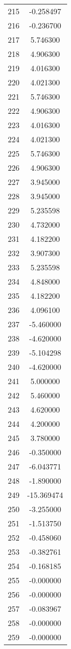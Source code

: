 \documentclass[12pt]{article}
\begin{document}
\begin{longtable}{@{}cc@{}}
215 & -0.258497 \\
216 & -0.236700 \\
217 & 5.746300 \\
218 & 4.906300 \\
219 & 4.016300 \\
220 & 4.021300 \\
221 & 5.746300 \\
222 & 4.906300 \\
223 & 4.016300 \\
224 & 4.021300 \\
225 & 5.746300 \\
226 & 4.906300 \\
227 & 3.945000 \\
228 & 3.945000 \\
229 & 5.235598 \\
230 & 4.732000 \\
231 & 4.182200 \\
232 & 3.907300 \\
233 & 5.235598 \\
234 & 4.848000 \\
235 & 4.182200 \\
236 & 4.096100 \\
237 & -5.460000 \\
238 & -4.620000 \\
239 & -5.104298 \\
240 & -4.620000 \\
241 & 5.000000 \\
242 & 5.460000 \\
243 & 4.620000 \\
244 & 4.200000 \\
245 & 3.780000 \\
246 & -0.350000 \\
247 & -6.043771 \\
248 & -1.890000 \\
249 & -15.369474 \\
250 & -3.255000 \\
251 & -1.513750 \\
252 & -0.458060 \\
253 & -0.382761 \\
254 & -0.168185 \\
255 & -0.000000 \\
256 & -0.000000 \\
257 & -0.083967 \\
258 & -0.000000 \\
259 & -0.000000 \\

\end{longtable}
\end{document}
